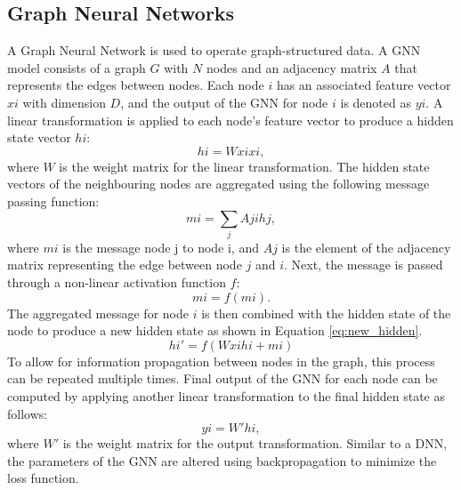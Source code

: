 \subsection{Graph Neural Networks}
A Graph Neural Network is used to operate graph-structured data. A GNN model consists of a graph $G$ with $N$ nodes and an adjacency matrix $A$ that represents the edges between nodes. Each node $i$ has an associated feature vector $xi$ with dimension $D$, and the output of the GNN for node $i$ is denoted as $yi$. A linear transformation is applied to each node's feature vector to produce a hidden state vector $hi$:
%
\begin{equation*}
    hi = Wxixi,\tag{6}
\end{equation*}
%
where $W$ is the weight matrix for the linear transformation. The hidden state vectors of the neighbouring nodes are aggregated using the following message passing function:
%
\begin{equation*}
    mi = {\sum \limits _{j}} Ajihj,\tag{7}
\end{equation*}
%
where $mi$ is the message node j to node i, and $Aj$ is the element of the adjacency matrix representing the edge between node $j$ and $i$. Next, the message is passed through a non-linear activation function $f$:
%
\begin{equation*}
    mi = f(mi).\tag{8}
\end{equation*}
%
The aggregated message for node $i$ is then combined with the hidden state of the node to produce a new hidden state as shown in Equation \ref{eq:new_hidden}.
%
\begin{equation*}
    \label{eq:new_hidden}
    hi' = f(Wxihi + mi) \tag{9}
\end{equation*}
%
To allow for information propagation between nodes in the graph, this process can be repeated multiple times. Final output of the GNN for each node can be computed by applying another linear transformation to the final hidden state as follows:
%
\begin{equation*}
    yi = W'hi,\tag{10}
\end{equation*}
%
where $W'$ is the weight matrix for the output transformation. Similar to a DNN, the parameters of the GNN are altered using backpropagation to minimize the loss function.

